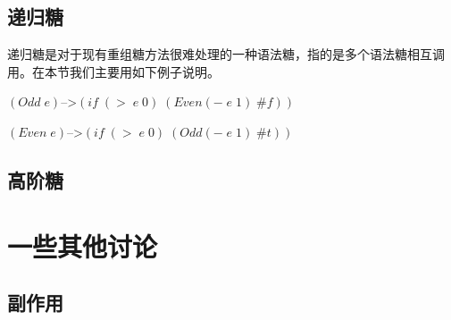 \subsection{递归糖}

递归糖是对于现有重组糖方法很难处理的一种语法糖，指的是多个语法糖相互调用。在本节我们主要用如下例子说明。

$(Odd\;e)$-->$(if\;(>\;e\;0)\;(Even (-\;e\;1)\;\#f))$

$(Even\;e)$-->$(if\;(>\;e\;0)\;(Odd (-\;e\;1)\;\#t))$
\subsection{高阶糖}

\section{一些其他讨论}

\subsection{副作用}